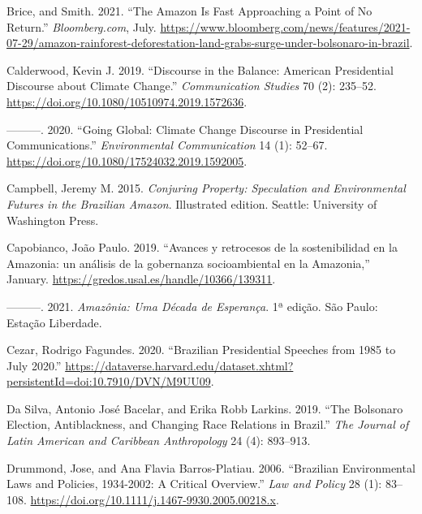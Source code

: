 \documentclass[
  12pt,
]{article}
\newlength{\cslhangindent}
\newlength{\cslentryspacingunit} %
\newenvironment{CSLReferences}[2] %
 {%
  \setlength{\parindent}{0pt}
  \ifodd #1
  \let\oldpar\par
  \def\par{\hangindent=\cslhangindent\oldpar}
  \fi
  \setlength{\parskip}{#2\cslentryspacingunit}
 }%
 {}
\begin{document}
\begin{CSLReferences}{1}{0}
\leavevmode{}%
Brice, and Smith. 2021. {``The Amazon Is Fast Approaching a Point of No
Return.''} \emph{Bloomberg.com}, July.
\url{https://www.bloomberg.com/news/features/2021-07-29/amazon-rainforest-deforestation-land-grabs-surge-under-bolsonaro-in-brazil}.

\leavevmode{}%
Calderwood, Kevin J. 2019. {``Discourse in the Balance: American
Presidential Discourse about Climate Change.''} \emph{Communication
Studies} 70 (2): 235--52.
\url{https://doi.org/10.1080/10510974.2019.1572636}.

\leavevmode{}%
---------. 2020. {``Going Global: Climate Change Discourse in
Presidential Communications.''} \emph{Environmental Communication} 14
(1): 52--67. \url{https://doi.org/10.1080/17524032.2019.1592005}.

\leavevmode{}%
Campbell, Jeremy M. 2015. \emph{Conjuring Property: Speculation and
Environmental Futures in the Brazilian Amazon}. Illustrated edition.
Seattle: University of Washington Press.

\leavevmode{}%
Capobianco, João Paulo. 2019. {``Avances y retrocesos de la
sostenibilidad en la Amazonia: un análisis de la gobernanza
socioambiental en la Amazonia,''} January.
\url{https://gredos.usal.es/handle/10366/139311}.

\leavevmode{}%
---------. 2021. \emph{Amazônia: Uma Década de Esperança}. 1ª edição.
São Paulo: Estação Liberdade.

\leavevmode{}%
Cezar, Rodrigo Fagundes. 2020. {``Brazilian Presidential Speeches from
1985 to July 2020.''}
\url{https://dataverse.harvard.edu/dataset.xhtml?persistentId=doi:10.7910/DVN/M9UU09}.

\leavevmode{}%
Da Silva, Antonio José Bacelar, and Erika Robb Larkins. 2019. {``The
Bolsonaro Election, Antiblackness, and Changing Race Relations in
Brazil.''} \emph{The Journal of Latin American and Caribbean
Anthropology} 24 (4): 893--913.

\leavevmode{}%
Drummond, Jose, and Ana Flavia Barros-Platiau. 2006. {``Brazilian
Environmental Laws and Policies, 1934-2002: A Critical Overview.''}
\emph{Law and Policy} 28 (1): 83--108.
\url{https://doi.org/10.1111/j.1467-9930.2005.00218.x}.


\end{CSLReferences}
\end{document}

